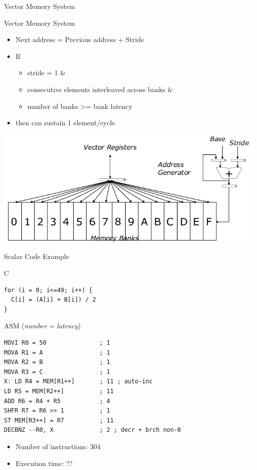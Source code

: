 \documentclass[presentation]{beamer}
\begin{document}
\begin{frame}[label={sec:org5889203}]{Vector Memory System}
\begin{block}{Vector Memory System}
\begin{itemize}
\item Next address = Previous address + Stride
\item If
\begin{itemize}
\item stride = 1 \&
\item consecutive elements interleaved across banks \&
\item number of banks >= bank latency
\end{itemize}
\item then can sustain \alert{1 element/cycle}
\end{itemize}
\end{block}

\begin{block}{}
\begin{center}
\includegraphics[width=.9\linewidth]{./images/slides_SIMD_33_small.png}
\end{center}
\end{block}
\end{frame}


\begin{frame}[label={sec:org22b6a6b},fragile]{Scalar Code Example}
 \begin{block}{C}
\lstset{language=C,label= ,caption= ,captionpos=b,numbers=none}
\begin{lstlisting}
for (i = 0; i<=49; i++) {
  C[i] = (A[i] + B[i]) / 2
}
\end{lstlisting}
\end{block}
\begin{block}{ASM (\emph{number = latency})}
\lstset{language=asm,label= ,caption= ,captionpos=b,numbers=none}
\begin{lstlisting}
MOVI R0 = 50               ; 1
MOVA R1 = A                ; 1
MOVA R2 = B                ; 1
MOVA R3 = C                ; 1
X: LD R4 = MEM[R1++]       ; 11 ; auto-inc
LD R5 = MEM[R2++]          ; 11
ADD R6 = R4 + R5           ; 4
SHFR R7 = R6 >> 1          ; 1
ST MEM[R3++] = R7          ; 11
DECBNZ --R0, X             ; 2 ; decr + brch non-0
\end{lstlisting}
\begin{itemize}
\item Number of \alert{instructions}: \alert{\(304\)}
\item Execution time: ??
\end{itemize}
\end{block}
\end{frame}
\end{document}
